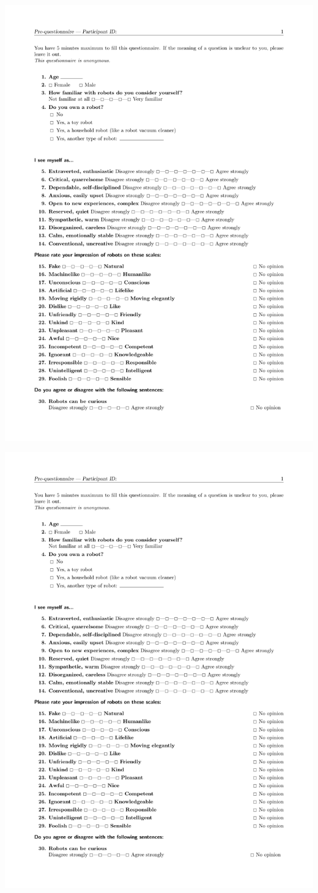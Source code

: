 \documentclass[lettersize, noapacite, twoside, HRI]{apa_HRI}
\begin{document}
\begin{center}
    \includegraphics[width=0.9\linewidth]{pre-questionnaire}

    \includegraphics[width=0.9\linewidth, page=2]{pre-questionnaire}
\end{center}
\end{document}
